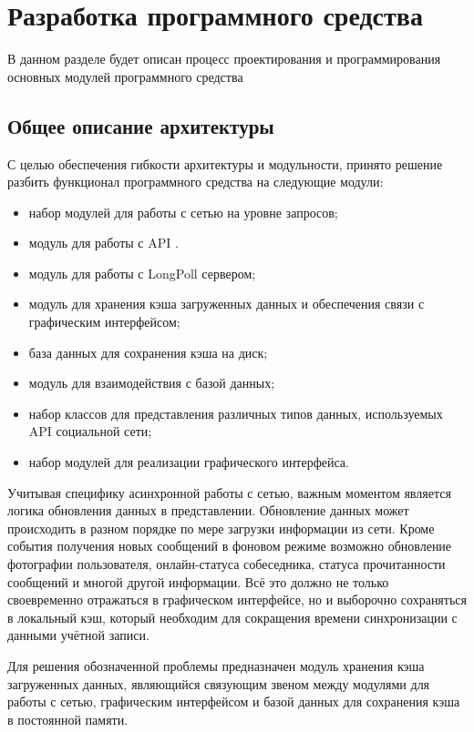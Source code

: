 \section{Разработка программного средства}

В данном разделе будет описан процесс проектирования и программирования основных
модулей программного средства

\subsection{Общее описание архитектуры}
С целью обеспечения гибкости архитектуры и модульности, принято решение разбить
функционал программного средства на следующие \mbox{модули}:
\begin{itemize}
  \item набор модулей для работы с сетью на уровне запросов;
  \item модуль для работы с API \vk{}.
  \item модуль для работы с LongPoll сервером;
  \item модуль для хранения кэша загруженных данных и обеспечения связи с
  графическим интерфейсом;
  \item база данных для сохранения кэша на диск;
  \item модуль для взаимодействия с базой данных;
  \item набор классов для представления различных типов данных, используемых API
  социальной сети;
  \item набор модулей для реализации графического интерфейса.
\end{itemize}

Учитывая специфику асинхронной работы с сетью, важным моментом является логика
обновления данных в представлении. Обновление данных может происходить в разном
порядке по мере загрузки информации из сети. Кроме события получения новых
сообщений в фоновом режиме возможно обновление фотографии пользователя,
онлайн-статуса собеседника, статуса прочитанности сообщений и многой другой
информации. Всё это должно не только своевременно отражаться в графическом
интерфейсе, но и выборочно сохраняться в локальный кэш, который необходим для
сокращения времени синхронизации с данными учётной записи.

Для решения обозначенной проблемы предназначен модуль хранения кэша загруженных
данных, являющийся связующим звеном между модулями для работы с сетью,
графическим интерфейсом и базой данных для сохранения кэша в постоянной памяти.

